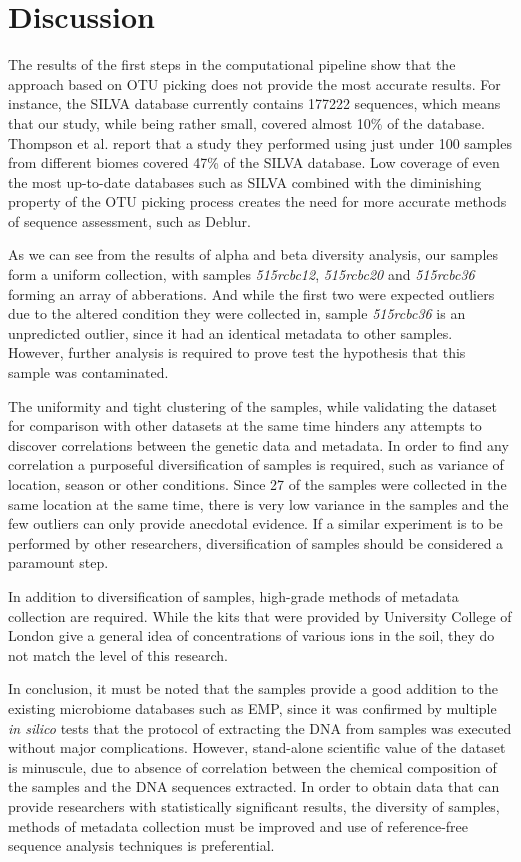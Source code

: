 \documentclass[12pt,twocolumn]{article} %
\begin{document}
%
%

\section{Discussion}
The results of the first steps in the computational pipeline show that the approach based on OTU picking does not provide the most accurate results. For instance, the SILVA database currently contains 177222 sequences, which means that our study, while being rather small, covered almost 10\% of the database. Thompson et al.\cite{Thompson2017} report that a study they performed using just under 100 samples from different biomes covered  47\% of the SILVA database. Low coverage of even the most up-to-date databases such as SILVA combined with the diminishing property of the OTU picking process creates the need for more accurate methods of sequence assessment, such as Deblur\cite{Amir}. 
\par
As we can see from the results of alpha and beta diversity analysis, our samples form a uniform collection, with samples \textit{515rcbc12}, \textit{515rcbc20} and \textit{515rcbc36} forming an array of abberations. And while the first two were expected outliers due to the altered condition they were collected in, sample \textit{515rcbc36} is an unpredicted outlier, since it had an identical metadata to other samples. However, further analysis is required to prove test the hypothesis that this sample was contaminated.
\par
The uniformity and tight clustering of the samples, while validating the dataset for comparison with other datasets at the same time hinders any attempts to discover correlations between the genetic data and metadata. In order to find any correlation a purposeful diversification of samples is required, such as variance of location, season or other conditions. Since 27 of the samples were collected in the same location at the same time, there is very low variance in the samples and the few outliers can only provide anecdotal evidence. If a similar experiment is to be performed by other researchers, diversification of samples should be considered a paramount step.
\par
In addition to diversification of samples, high-grade methods of metadata collection are required. While the kits that were provided by University College of London give a general idea of concentrations of various ions in the soil, they do not match the level of this research.
\par
In conclusion, it must be noted that the samples provide a good addition to the existing microbiome databases such as EMP, since it was confirmed by multiple \textit{in silico} tests that the protocol of extracting the DNA from samples was executed without major complications. However, stand-alone scientific value of the dataset is minuscule, due to absence of correlation between the chemical composition of the samples and the DNA sequences extracted. In order to obtain data that can provide researchers with statistically significant results, the diversity of samples, methods of metadata collection must be improved and use of reference-free sequence analysis techniques is preferential.
 



\end{document}
